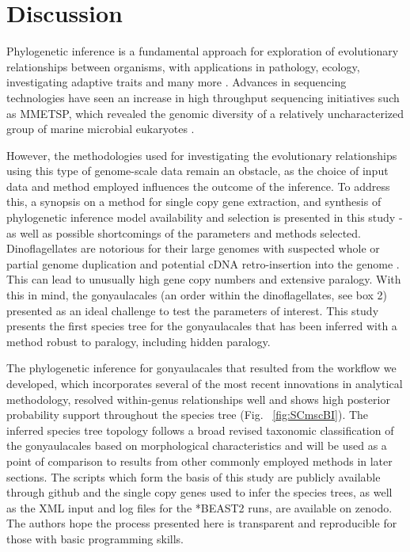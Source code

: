 \documentclass[fleqn,10pt,lineno]{wlpeerj} %
\begin{document}
\section*{Discussion}
Phylogenetic inference is a fundamental approach for exploration of evolutionary relationships between organisms, with applications in pathology, ecology, investigating adaptive traits and many more \citep{heath2008taxon}.
Advances in sequencing technologies have seen an increase in high throughput sequencing initiatives such as MMETSP, which revealed the genomic diversity of a relatively uncharacterized group of marine microbial eukaryotes \citep{keeling2014marine}. 

However, the methodologies used for investigating the evolutionary relationships using this type of genome-scale data remain an obstacle, as the choice of input data and method employed influences the outcome of the inference. 
To address this, a synopsis on a method for single copy gene extraction, and synthesis of phylogenetic inference model availability and selection is presented in this study - as well as possible shortcomings of the parameters and methods selected. \\
Dinoflagellates are notorious for their large genomes with suspected whole or partial genome duplication and potential cDNA retro-insertion into the genome \citep{van2009florida,beauchemin2012dinoflagellate,slamovits2008widespread,hou2009distinct,lin2011genomic}. 
This can lead to unusually high gene copy numbers and extensive paralogy. 
With this in mind, the gonyaulacales (an order within the dinoflagellates, see box 2) presented as an ideal challenge to test the parameters of interest. 
This study presents the first species tree for the gonyaulacales that has been inferred with a method robust to paralogy, including hidden paralogy.

The phylogenetic inference for gonyaulacales that resulted from the workflow we developed, which incorporates several of the most recent innovations in analytical methodology, resolved within-genus relationships well and shows high posterior probability support throughout the species tree (Fig. ~\ref{fig:SCmscBI}). 
The inferred species tree topology follows a broad revised taxonomic classification of the gonyaulacales based on morphological characteristics \citep{hoppenrath2017dinoflagellate} and will be used as a point of comparison to results from other commonly employed methods in later sections. 
The scripts which form the basis of this study are publicly available through github and the single copy genes used to infer the species trees, as well as the XML input and log files for the *BEAST2 runs, are available on zenodo. 
The authors hope the process presented here is transparent and reproducible for those with basic programming skills. 
\end{document}

